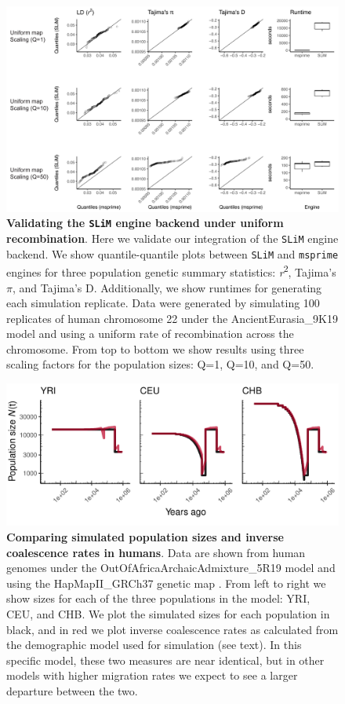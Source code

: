 \documentclass[12pt,halfline,a4paper]{ouparticle}
\begin{document}
\begin{figure}
\begin{center}
\includegraphics[width=0.8\linewidth]{display_items/HomSap_AE9K19_chr22_nomap_AI.pdf}
\caption{\textbf{Validating the \texttt{SLiM} engine backend under uniform recombination}.
Here we validate our integration of the \texttt{SLiM} \citep{haller2019tree,haller2019slim} engine backend.
We show quantile-quantile plots between \texttt{SLiM} and \texttt{msprime} engines for three
population genetic summary statistics: \textit{r}\textsuperscript{2}, Tajima's $\pi$, and Tajima's D. Additionally, we
show runtimes for generating each simulation replicate. Data were generated by simulating 100 replicates
of human chromosome 22 under the AncientEurasia\_9K19 model \citep{kamm2019efficiently} and using a uniform
rate of recombination across the chromosome. From top to bottom we show results
using three scaling factors for the population sizes: Q=1, Q=10, and Q=50.
}
\label{fig:slim_val_nomap}
\end{center}
\end{figure}

\begin{figure}
\begin{center}
\includegraphics[width=0.8\linewidth]{display_items/HomSap_OutOfAfricaArchaicAdmixture_5R19_census_vs_IRC.pdf}
\caption{\textbf{Comparing simulated population sizes and inverse coalescence rates in humans}.
Data are shown from human genomes under the OutOfAfricaArchaicAdmixture\_5R19 model \citep{ragsdale2019models}
and using the HapMapII\_GRCh37 genetic map \citep{international2007second}.
From left to right we show sizes for each of the three populations in the model: YRI, CEU, and CHB.
We plot the simulated sizes for each population in black, and in red we plot
inverse coalescence rates as calculated from the demographic model used for simulation (see text).
In this specific model, these two measures are near identical, but in other models with higher migration rates
we expect to see a larger departure between the two.
}
\label{fig:census_vs_IRC}
\end{center}
\end{figure}
\end{document}
